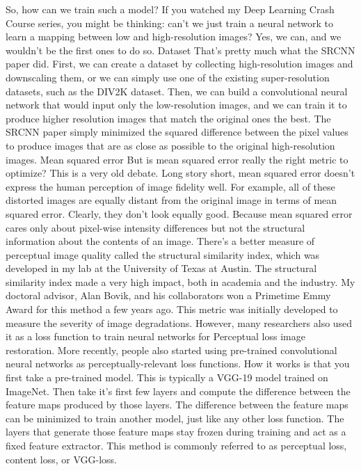 So, how can we train such a model?
If you watched my Deep Learning Crash Course series, you might be thinking: can't we just
train a neural network to learn a mapping between low and high-resolution images?
Yes, we can, and we wouldn't be the first ones to do so.
Dataset
That's pretty much what the SRCNN paper did.
First, we can create a dataset by collecting high-resolution images and downscaling them,
or we can simply use one of the existing super-resolution datasets, such as the DIV2K dataset.
Then, we can build a convolutional neural network that would input only the low-resolution
images, and we can train it to produce higher resolution images that match the original
ones the best.
The SRCNN paper simply minimized the squared difference between the pixel values to produce
images that are as close as possible to the original high-resolution images.
Mean squared error
But is mean squared error really the right metric to optimize?
This is a very old debate.
Long story short, mean squared error doesn't express the human perception of image fidelity
well.
For example, all of these distorted images are equally distant from the original image
in terms of mean squared error.
Clearly, they don't look equally good.
Because mean squared error cares only about pixel-wise intensity differences but not the
structural information about the contents of an image.
There's a better measure of perceptual image quality called the structural similarity index,
which was developed in my lab at the University of Texas at Austin.
The structural similarity index made a very high impact, both in academia and the industry.
My doctoral advisor, Alan Bovik, and his collaborators won a Primetime Emmy Award for this method
a few years ago.
This metric was initially developed to measure the severity of image degradations.
However, many researchers also used it as a loss function to train neural networks for
Perceptual loss
image restoration.
More recently, people also started using pre-trained convolutional neural networks as perceptually-relevant
loss functions.
How it works is that you first take a pre-trained model.
This is typically a VGG-19 model trained on ImageNet.
Then take it's first few layers and compute the difference between the feature maps produced
by those layers.
The difference between the feature maps can be minimized to train another model, just
like any other loss function.
The layers that generate those feature maps stay frozen during training and act as a fixed
feature extractor.
This method is commonly referred to as perceptual loss, content loss, or VGG-loss.
